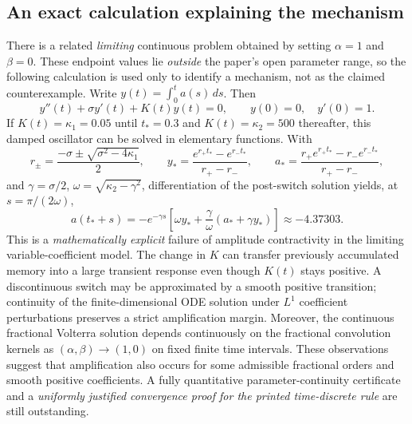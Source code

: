 \documentclass[11pt,a4paper]{amsart}
\theoremstyle{remark}
\theoremstyle{plain}
\theoremstyle{remark}
\numberwithin{equation}{section}
\begin{document}
\subsection{An exact calculation explaining the mechanism}
There is a related \emph{limiting} continuous problem obtained by setting $\alpha=1$ and $\beta=0$. These endpoint values lie \emph{outside} the paper's open parameter range, so the following calculation is used only to identify a mechanism, not as the claimed counterexample.
Write $y(t)=\int_0^t a(s)\,ds$. Then
\begin{equation}\label{eq:st04-osc}
 y''(t)+\sigma y'(t)+K(t)y(t)=0,
 \qquad y(0)=0,\quad y'(0)=1.
\end{equation}
If $K(t)=\kappa_1=0.05$ until $t_*=0.3$ and $K(t)=\kappa_2=500$ thereafter, this damped oscillator can be solved in elementary functions. With
\[
 r_\pm=\frac{-\sigma\pm\sqrt{\sigma^2-4\kappa_1}}{2},
 \qquad y_* =\frac{e^{r_+t_*}-e^{r_-t_*}}{r_+-r_-},
 \qquad a_* =\frac{r_+e^{r_+t_*}-r_-e^{r_-t_*}}{r_+-r_-},
\]
and $\gamma=\sigma/2$, $\omega=\sqrt{\kappa_2-\gamma^2}$, differentiation of the post-switch solution yields, at $s=\pi/(2\omega)$,
\begin{equation}\label{eq:st04-limit}
 a(t_*+s)=-e^{-\gamma s}
 \left[\omega y_*+\frac{\gamma}{\omega}(a_*+\gamma y_*)\right]
 \approx-4.37303.
\end{equation}
This is a \emph{mathematically explicit} failure of amplitude contractivity in the limiting variable-coefficient model. The change in $K$ can transfer previously accumulated memory into a large transient response even though $K(t)$ stays positive. A discontinuous switch may be approximated by a smooth positive transition; continuity of the finite-dimensional ODE solution under $L^1$ coefficient perturbations preserves a strict amplification margin. Moreover, the continuous fractional Volterra solution depends continuously on the fractional convolution kernels as $(\alpha,\beta)\to(1,0)$ on fixed finite time intervals. These observations suggest that amplification also occurs for some admissible fractional orders and smooth positive coefficients. A fully quantitative parameter-continuity certificate and a \emph{uniformly justified convergence proof for the printed time-discrete rule} are still outstanding.
\end{document}

